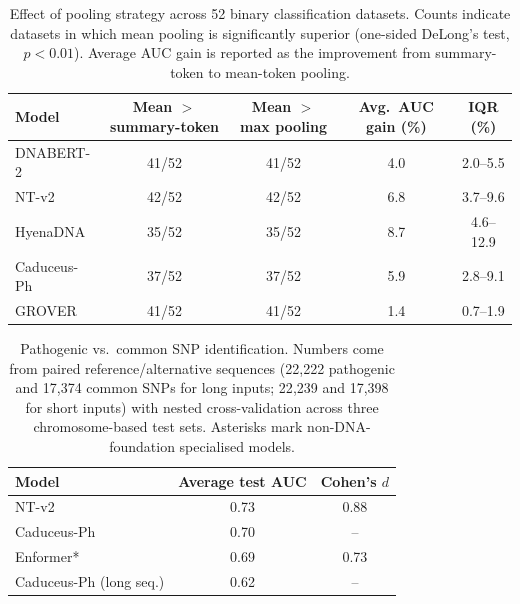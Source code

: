 \documentclass[11pt,a4paper]{article}
\begin{document}
\begin{table}[htbp]
\centering
\small
\caption{Effect of pooling strategy across 52 binary classification datasets. Counts indicate datasets in which mean pooling is significantly superior (one-sided DeLong's test, $p < 0.01$). Average AUC gain is reported as the improvement from summary-token to mean-token pooling.}
\label{tab:pooling}
\begin{tabular}{@{}lcccc@{}}
\toprule
Model & Mean $>$ summary-token & Mean $>$ max pooling & Avg.\ AUC gain (\%) & IQR (\%) \\
\midrule
DNABERT-2   & 41/52 & 41/52 & 4.0 & 2.0--5.5 \\
NT-v2       & 42/52 & 42/52 & 6.8 & 3.7--9.6 \\
HyenaDNA    & 35/52 & 35/52 & 8.7 & 4.6--12.9 \\
Caduceus-Ph & 37/52 & 37/52 & 5.9 & 2.8--9.1 \\
GROVER      & 41/52 & 41/52 & 1.4 & 0.7--1.9 \\
\bottomrule
\end{tabular}
\end{table}

\begin{table}[htbp]
\centering
\small
\caption{Pathogenic vs.\ common SNP identification. Numbers come from paired reference/alternative sequences (22{,}222 pathogenic and 17{,}374 common SNPs for long inputs; 22{,}239 and 17{,}398 for short inputs) with nested cross-validation across three chromosome-based test sets. Asterisks mark non-DNA-foundation specialised models.}
\label{tab:snp}
\begin{tabular}{@{}lcc@{}}
\toprule
Model & Average test AUC & Cohen's $d$ \\
\midrule
NT-v2                 & 0.73 & 0.88 \\
Caduceus-Ph           & 0.70 & -- \\
Enformer*             & 0.69 & 0.73 \\
Caduceus-Ph (long seq.) & 0.62 & -- \\
\bottomrule
\end{tabular}
\end{table}
\end{document}
